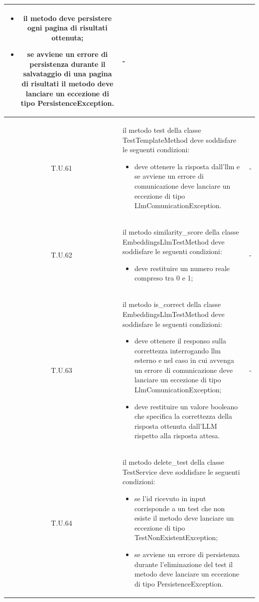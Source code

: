 \begin{tabularx}{\textwidth}{|c|X|c|}
\begin{itemize}
        \item il metodo deve persistere ogni pagina di risultati ottenuta;
        \item se avviene un errore di persistenza durante il salvataggio di una pagina di risultati il metodo deve lanciare un eccezione di tipo PersistenceException.
    \end{itemize} & - \\
    \hline 
    \label{tu:tu61} T.U.61 & il metodo test della classe TestTemplateMethod deve soddisfare le seguenti condizioni:
    \begin{itemize}
        \item deve ottenere la risposta dall'llm e se avviene un errore di comunicazione deve lanciare un eccezione di tipo LlmComunicationException. 
    \end{itemize} & - \\
    \hline 
    \label{tu:tu62} T.U.62 & il metodo similarity\_score della classe EmbeddingsLlmTestMethod deve soddisfare le seguenti condizioni:
    \begin{itemize}
        \item deve restituire un numero reale compreso tra 0 e 1;
    \end{itemize} & - \\
    \hline 
    \label{tu:tu63} T.U.63 & il metodo is\_correct della classe EmbeddingsLlmTestMethod deve soddisfare le seguenti condizioni:
    \begin{itemize}
        \item deve ottenere il responso sulla correttezza interrogando llm esterno e nel caso in cui avvenga un errore di comunicazione deve lanciare un eccezione di tipo LlmComunicationException; 
        \item deve restituire un valore booleano che specifica la correttezza della risposta ottenuta dall'LLM rispetto alla risposta attesa.
    \end{itemize} & - \\
    \hline 
    \label{tu:tu64} T.U.64 & il metodo delete\_test della classe TestService deve soddisfare le seguenti condizioni:
    \begin{itemize}
        \item se l'id ricevuto in input corrisponde a un test che non esiste il metodo deve lanciare un eccezione di tipo TestNonExistentException;
        \item se avviene un errore di persistenza durante l'eliminazione del test il metodo deve lanciare un eccezione di tipo PersistenceException.

\end{itemize}
\end{tabularx}
